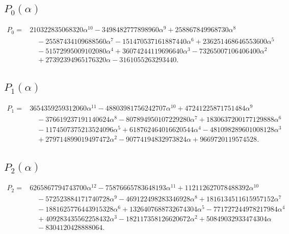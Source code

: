 \documentclass[9pt]{extarticle}
\begin{document}
{\scriptsize
\subsection*{$P_0(\alpha)$}
\begin{align*}
P_0={}& 210322835068320\alpha^{10} - 3498482777898960\alpha^{9} + 258867849968730\alpha^{8} \\
&\quad - 25587434109688560\alpha^{7} - 151470537161887440\alpha^{6} + 236251468646553600\alpha^{5} \\
&\quad - 51572995009102080\alpha^{4} + 36074244119696640\alpha^{3} - 73265007106406400\alpha^{2} \\
&\quad + 27392394965176320\alpha - 3161055263293440.
\end{align*}

\subsection*{$P_1(\alpha)$}
\begin{align*}
P_1={}& 3654359259312060\alpha^{11} - 48803981756242707\alpha^{10} + 47241225871751484\alpha^{9} \\
&\quad - 376619237191140624\alpha^{8} - 807894950107229280\alpha^{7} + 1830637200177129888\alpha^{6} \\
&\quad - 1174507375213524096\alpha^{5} + 618762464016620544\alpha^{4} - 481098289601008128\alpha^{3} \\
&\quad + 279714899019497472\alpha^{2} - 90774194832973824\alpha + 9669720119574528.
\end{align*}

\subsection*{$P_2(\alpha)$}
\begin{align*}
P_2={}& 6265867794743700\alpha^{12} - 75876665783648193\alpha^{11} + 112112627078488392\alpha^{10} \\
&\quad - 572523884171740728\alpha^{9} - 469122498283346928\alpha^{8} + 1816134511615957152\alpha^{7} \\
&\quad - 1881625776443915328\alpha^{6} + 1326407688732674304\alpha^{5} - 771727244978217984\alpha^{4} \\
&\quad + 409283435562258432\alpha^{3} - 182117358126620672\alpha^{2} + 50849032933474304\alpha \\
&\quad - 8304120428888064.
\end{align*}

}
\end{document}
